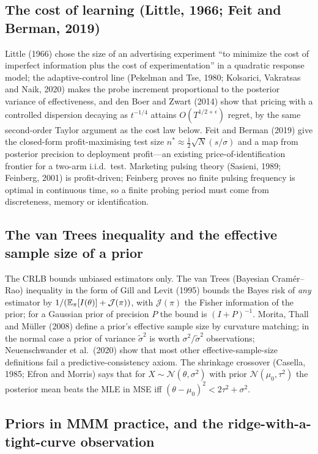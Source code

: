 \subsection{The cost of learning (Little, 1966; Feit and Berman, 2019)}

Little (1966) chose the size of an advertising experiment ``to minimize the cost of imperfect information plus the cost of experimentation'' in a quadratic response model; the adaptive-control line (Pekelman and Tse, 1980; Kolsarici, Vakratsas and Naik, 2020) makes the probe increment proportional to the posterior variance of effectiveness, and den Boer and Zwart (2014) show that pricing with a controlled dispersion decaying as $t^{-1/4}$ attains $O(T^{1/2+\epsilon})$ regret, by the same second-order Taylor argument as the cost law below. Feit and Berman (2019) give the closed-form profit-maximising test size $n^* \approx \tfrac12\sqrt N(s/\sigma)$ and a map from posterior precision to deployment profit---an existing price-of-identification frontier for a two-arm i.i.d.\ test. Marketing pulsing theory (Sasieni, 1989; Feinberg, 2001) is profit-driven; Feinberg proves no finite pulsing frequency is optimal in continuous time, so a finite probing period must come from discreteness, memory or identification.

\subsection{The van Trees inequality and the effective sample size of a prior}

The CRLB bounds unbiased estimators only. The van Trees (Bayesian Cram\'er--Rao) inequality in the form of Gill and Levit (1995) bounds the Bayes risk of \emph{any} estimator by $1/(\mathbb{E}_\pi[I(\theta)] + \mathcal J(\pi))$, with $\mathcal J(\pi)$ the Fisher information of the prior; for a Gaussian prior of precision $P$ the bound is $(I + P)^{-1}$. Morita, Thall and M\"uller (2008) define a prior's effective sample size by curvature matching; in the normal case a prior of variance $\tilde\sigma^2$ is worth $\sigma^2/\tilde\sigma^2$ observations; Neuenschwander et al.\ (2020) show that most other effective-sample-size definitions fail a predictive-consistency axiom. The shrinkage crossover (Casella, 1985; Efron and Morris) says that for $X \sim \mathcal N(\theta, \sigma^2)$ with prior $\mathcal N(\mu_0, \tau^2)$ the posterior mean beats the MLE in MSE iff $(\theta - \mu_0)^2 < 2\tau^2 + \sigma^2$.

\subsection{Priors in MMM practice, and the ridge-with-a-tight-curve observation}

